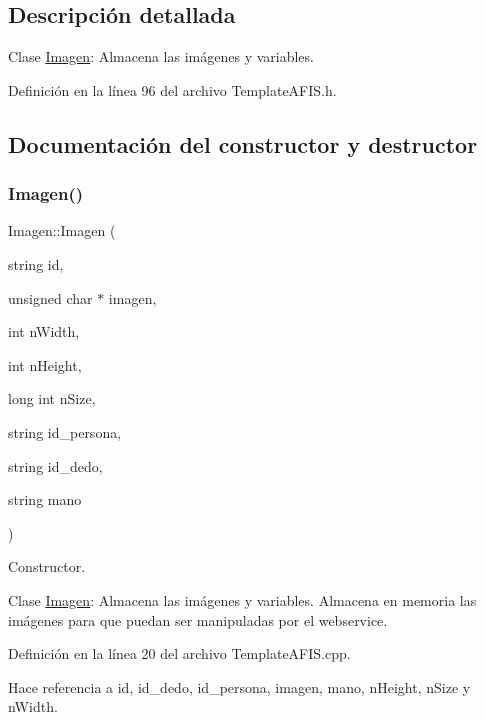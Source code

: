 \subsection{Descripción detallada}
Clase \hyperlink{classImagen}{Imagen}\+: Almacena las imágenes y variables. 

Definición en la línea 96 del archivo Template\+A\+F\+I\+S.\+h.



\subsection{Documentación del constructor y destructor}
\hypertarget{classImagen_a806163aa3eaf4022030a49275ddf4d2b}{}\label{classImagen_a806163aa3eaf4022030a49275ddf4d2b} 
\subsubsection{\texorpdfstring{Imagen()}{Imagen()}}
{\footnotesize\ttfamily Imagen\+::\+Imagen (\begin{DoxyParamCaption}\item[{string}]{id,  }\item[{unsigned char $\ast$}]{imagen,  }\item[{int}]{n\+Width,  }\item[{int}]{n\+Height,  }\item[{long int}]{n\+Size,  }\item[{string}]{id\+\_\+persona,  }\item[{string}]{id\+\_\+dedo,  }\item[{string}]{mano }\end{DoxyParamCaption})}



Constructor. 

Clase \hyperlink{classImagen}{Imagen}\+: Almacena las imágenes y variables. Almacena en memoria las imágenes para que puedan ser manipuladas por el webservice. 

Definición en la línea 20 del archivo Template\+A\+F\+I\+S.\+cpp.



Hace referencia a id, id\+\_\+dedo, id\+\_\+persona, imagen, mano, n\+Height, n\+Size y n\+Width.

\hypertarget{classImagen_a03dd93c9cf920a9dc0b72f8bd34f2e8a}{}\label{classImagen_a03dd93c9cf920a9dc0b72f8bd34f2e8a} 

